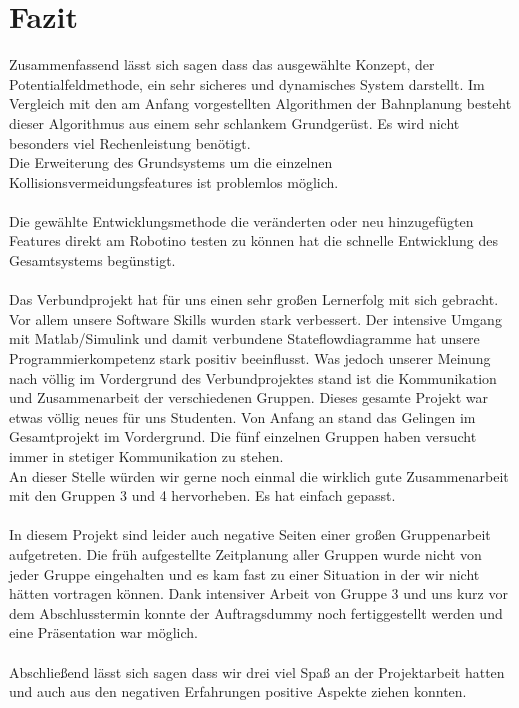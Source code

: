 \chapter{Fazit}
\label{cha:fazit}
Zusammenfassend lässt sich sagen dass das ausgewählte Konzept, der Potentialfeldmethode, ein sehr sicheres und dynamisches System darstellt. Im Vergleich mit den am Anfang vorgestellten Algorithmen der Bahnplanung besteht dieser Algorithmus aus einem sehr schlankem Grundgerüst. Es wird nicht besonders viel Rechenleistung benötigt.\\
Die Erweiterung des Grundsystems um die einzelnen Kollisionsvermeidungsfeatures ist problemlos möglich.\\
\\
Die gewählte Entwicklungsmethode die veränderten oder neu hinzugefügten Features direkt am Robotino testen zu können hat die schnelle Entwicklung des Gesamtsystems begünstigt.\\
\\
Das Verbundprojekt hat für uns einen sehr großen Lernerfolg mit sich gebracht. Vor allem unsere Software Skills wurden stark verbessert. Der intensive Umgang mit Matlab/Simulink und damit verbundene Stateflowdiagramme hat unsere Programmierkompetenz stark positiv beeinflusst. Was jedoch unserer Meinung nach völlig im Vordergrund des Verbundprojektes stand ist die Kommunikation und Zusammenarbeit der verschiedenen Gruppen.
Dieses gesamte Projekt war etwas völlig neues für uns Studenten. Von Anfang an stand das Gelingen im Gesamtprojekt im Vordergrund. Die fünf einzelnen Gruppen haben versucht immer in stetiger Kommunikation zu stehen. \\
An dieser Stelle würden wir gerne noch einmal die wirklich gute Zusammenarbeit mit den Gruppen 3 und 4 hervorheben. Es hat einfach gepasst.\\
\\
In diesem Projekt sind leider auch negative Seiten  einer großen Gruppenarbeit aufgetreten. Die früh aufgestellte Zeitplanung aller Gruppen wurde nicht von jeder Gruppe eingehalten und es kam fast zu einer Situation in der wir nicht hätten vortragen können. Dank intensiver Arbeit von Gruppe 3 und uns kurz vor dem Abschlusstermin konnte der Auftragsdummy noch fertiggestellt werden und eine Präsentation war möglich.\\
\\
Abschließend lässt sich sagen dass wir drei viel Spaß an der Projektarbeit hatten und auch aus den negativen Erfahrungen positive Aspekte ziehen konnten.